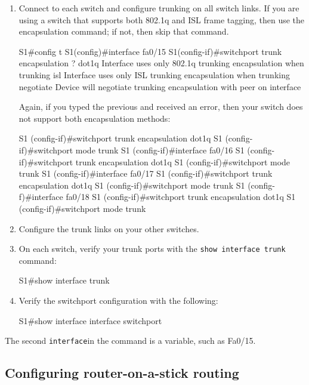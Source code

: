 \begin{enumerate}
\item
  Connect to each
  switch and configure trunking on all switch links. If you are using a
  switch that supports both 802.1q and ISL frame tagging, then use the
  encapsulation command; if not, then skip that command.

\begin{cli}
S1#config t
S1(config)#interface fa0/15
S1(config-if)#switchport trunk encapsulation ?
  dot1q  Interface uses only 802.1q trunking encapsulation when trunking
  isl    Interface uses only ISL trunking encapsulation when trunking
  negotiate   Device will negotiate trunking encapsulation with peer on interface
\end{cli}

  Again, if you typed the previous and received an error, then your
  switch does not support both encapsulation methods:

\begin{cli}
S1 (config-if)#switchport trunk encapsulation dot1q
S1 (config-if)#switchport mode trunk
S1 (config-if)#interface fa0/16
S1 (config-if)#switchport trunk encapsulation dot1q
S1 (config-if)#switchport mode trunk
S1 (config-if)#interface fa0/17
S1 (config-if)#switchport trunk encapsulation dot1q
S1 (config-if)#switchport mode trunk
S1 (config-f)#interface fa0/18
S1 (config-if)#switchport trunk encapsulation dot1q
S1 (config-if)#switchport mode trunk
\end{cli}
\item
  Configure the trunk links on your other switches.
\item
  On each switch, verify your trunk ports with the
  \texttt{show\ interface\ trunk} command:

\begin{cli}
S1#show interface trunk
\end{cli}
\item
  Verify the switchport configuration with the following:

\begin{cli}
S1#show interface interface switchport
\end{cli}
\end{enumerate}

The second \texttt{interface}in the command is a variable, such as
Fa0/15.

\subsection{Configuring router-on-a-stick routing}

